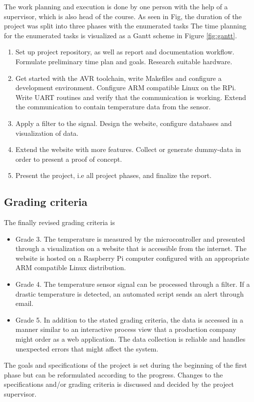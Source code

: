 The work planning and execution is done by one person with the help of a supervisor, which is also head of the course. As seen in Fig, the duration of the project was split into three phases with the enumerated tasks
\newpage
The time planning for the enumerated tasks is visualized as a Gantt scheme in Figure \ref{fig:gantt}.
\begin{enumerate}
  \item
Set up project repository, as well as report and documentation workflow. Formulate preliminary time plan and goals. Research suitable hardware.
  \item
Get started with the AVR toolchain, write Makefiles and configure a development environment. Configure ARM compatible Linux on the RPi. Write UART routines and verify that the communication is working. Extend the communication to contain temperature data from the sensor.
  \item
    Apply a filter to the signal. Design the website, configure databases and visualization of data.
  \item
    Extend the website with more features. Collect or generate dummy-data in order to present a proof of concept.
  \item Present the project, i.e all project phases, and finalize the report.
\end{enumerate}

\subsection{Grading criteria}%
\label{sub:grading_criteria}
The finally revised grading criteria is
\begin{itemize}
  \item 
    Grade 3. The temperature is measured by the microcontroller and presented through a visualization on a website that is accessible from the internet. The website is hosted on a Raspberry Pi computer configured with an appropriate ARM compatible Linux distribution.
  \item 
   Grade 4. The temperature sensor signal can be processed through a filter. If a drastic temperature is detected, an automated script sends an alert through email. 
  \item
   Grade 5. In addition to the stated grading criteria, the data is accessed in a manner similar to an interactive process view that a production company might order as a web application. The data collection is reliable and handles unexpected errors that might affect the system.
\end{itemize}

The goals and specifications of the project is set during the beginning of the first phase but can be reformulated according to the progress. Changes to the specifications and/or grading criteria is discussed and decided by the project supervisor.
